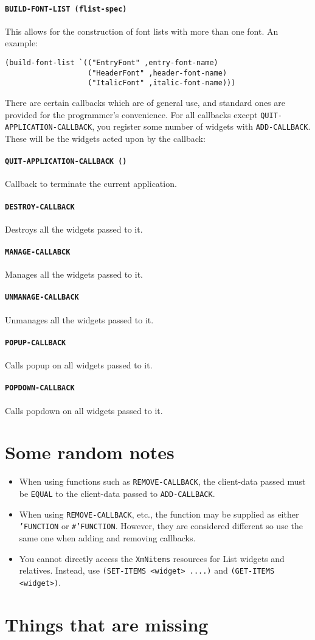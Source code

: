 \documentclass{article}
\newcommand{\functdescr}[1]{\paragraph{\texttt{#1}}}
\begin{document}
\functdescr{BUILD-FONT-LIST (flist-spec)} This allows for the
construction of font lists with more than one font.  An example:

\begin{verbatim}
(build-font-list `(("EntryFont" ,entry-font-name)
                   ("HeaderFont" ,header-font-name)
                   ("ItalicFont" ,italic-font-name)))
\end{verbatim}

There are certain callbacks which are of general use, and standard
ones are provided for the programmer's convenience.  For all callbacks
except \texttt{QUIT-APPLICATION-CALLBACK}, you register some number of widgets
with \texttt{ADD-CALLBACK}.  These will be the widgets acted upon by the
callback:

\functdescr{QUIT-APPLICATION-CALLBACK ()} Callback to terminate the
current application.

\functdescr{DESTROY-CALLBACK} Destroys all the widgets passed to it.
\functdescr{MANAGE-CALLABCK } Manages all the widgets passed to it.
\functdescr{UNMANAGE-CALLBACK} Unmanages all the widgets passed to it.
\functdescr{POPUP-CALLBACK } Calls popup on all widgets passed to it.
\functdescr{POPDOWN-CALLBACK} Calls popdown on all widgets passed to it.


\section{Some random notes}

\begin{itemize}

\item When using functions such as \texttt{REMOVE-CALLBACK}, the
	client-data passed must be \texttt{EQUAL} to the client-data
	passed to \texttt{ADD-CALLBACK}.

\item When using \texttt{REMOVE-CALLBACK}, etc., the function may be
	supplied as either \texttt{'FUNCTION} or \texttt{\#'FUNCTION}.
	However, they are considered different so use the same one
	when adding and removing callbacks.

\item You cannot directly access the \texttt{XmNitems} resources for
	List widgets and relatives.  Instead, use \texttt{(SET-ITEMS
	<widget> ....)} and \texttt{(GET-ITEMS <widget>)}.
\end{itemize}


\section{Things that are missing}
\end{document}
